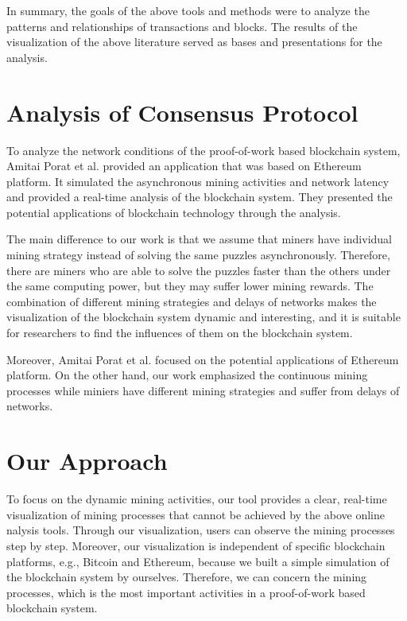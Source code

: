 In summary, the goals of the above tools and methods were to analyze the patterns and relationships of transactions and blocks. The results of the visualization of the above literature served as bases and presentations for the analysis. 

\section{Analysis of Consensus Protocol}

To analyze the network conditions of the proof-of-work based blockchain system, Amitai Porat et al. \cite{Porat} provided an application that was based on Ethereum platform. It simulated the asynchronous mining activities and network latency and provided a real-time analysis of the blockchain system. They presented the potential applications of blockchain technology through the analysis.

The main difference to our work is that we assume that miners have individual mining strategy instead of solving the same puzzles asynchronously. Therefore, there are miners who are able to solve the puzzles faster than the others under the same computing power, but they may suffer lower mining rewards. The combination of different mining strategies and delays of networks makes the visualization of the blockchain system dynamic and interesting, and it is suitable for researchers to find the influences of them on the blockchain system. 

Moreover, Amitai Porat et al. focused on the potential applications of Ethereum platform. On the other hand, our work emphasized the continuous mining processes while miniers have different mining strategies and suffer from delays of networks. 

\section{Our Approach}

To focus on the dynamic mining activities, our tool provides a clear, real-time visualization of mining processes that cannot be achieved by the above online nalysis tools. Through our visualization, users can observe the mining processes step by step. Moreover, our visualization is independent of specific blockchain platforms, e.g., Bitcoin and Ethereum, because we built a simple simulation of the blockchain system by ourselves. Therefore, we can concern the mining processes, which is the most important activities in a proof-of-work based blockchain system.

